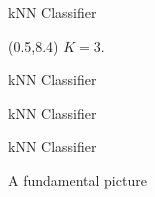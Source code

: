 \documentclass[14pt]{beamer}
\begin{document}
\begin{frame}{kNN Classifier}
\begin{textblock}{10}(0.5,8.4)
$K=3$.
\end{textblock}
\end{frame}


\begin{frame}{kNN Classifier}
\end{frame}

\begin{frame}{kNN Classifier}
\end{frame}


\begin{frame}{kNN Classifier}
\end{frame}


\begin{frame}{A fundamental picture}
\end{frame}
\end{document}
